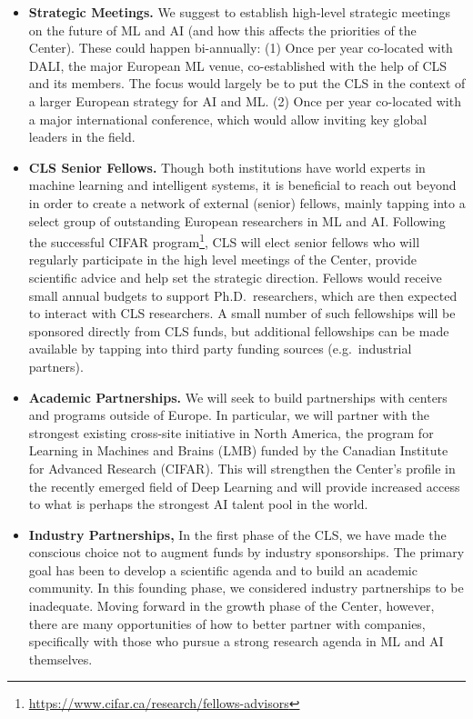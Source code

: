 \documentclass{article}
\begin{document}
\begin{itemize}
%
\item \textbf{Strategic Meetings.} We suggest to establish high-level strategic meetings on the future of ML and AI (and how this affects the priorities of the Center). These could happen bi-annually: (1) Once per year co-located with DALI, the major European ML venue, co-established with the help of CLS and its members. The focus would largely be to put the CLS in the context of a larger European strategy for AI and ML. (2) Once per year co-located with a major international conference, which would allow inviting key global leaders in the field. 
%
\item \textbf{CLS Senior Fellows.} Though both institutions have world experts in machine learning and intelligent systems, it is beneficial to reach out beyond in order to create a network of external (senior) fellows, mainly tapping into a select group of outstanding European researchers in ML and AI. Following the successful CIFAR program\footnote{\url{https://www.cifar.ca/research/fellows-advisors}}, CLS will elect senior fellows who will regularly participate in the high level meetings of the Center, provide scientific advice and help set the strategic direction. Fellows would receive small annual budgets to support Ph.D.~researchers, which are then expected to interact with CLS researchers. A small number of such fellowships will be sponsored directly from CLS funds, but additional fellowships can be made available by tapping into third party funding sources (e.g.~industrial partners).
%
\item \textbf{Academic Partnerships.} We will seek to build partnerships with centers and programs outside of Europe. In particular, we will partner with the strongest existing cross-site initiative in North America, the program for Learning in Machines and Brains (LMB) funded by the Canadian Institute for Advanced Research (CIFAR). This will strengthen the Center's profile in the recently emerged field of Deep Learning and will provide increased access to what is perhaps the strongest AI talent pool in the world. 
%
\item \textbf{Industry Partnerships,}  In the first phase of the CLS, we have made the conscious choice not to augment funds by industry sponsorships. The primary goal has been to develop a scientific agenda and to build an academic community. In this founding phase, we considered industry partnerships to be inadequate.  Moving forward in the growth phase of the Center, however, there are many opportunities of how to better partner with companies, specifically with those who pursue a strong research agenda in ML and AI themselves. 

\end{itemize}
\end{document}
